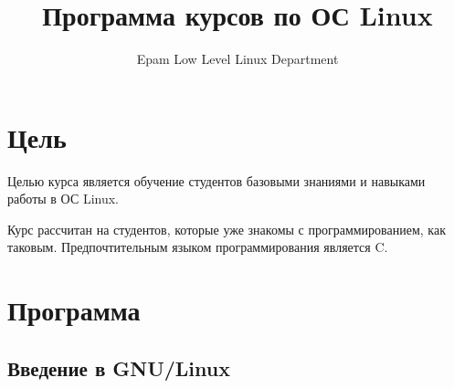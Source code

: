 \documentclass[12pt,a4paper,oneside]{article}
\begin{document}
\title{Программа курсов по ОС Linux}
\author{Epam Low Level Linux Department}
\maketitle

\renewcommand{\contentsname}{Оглавление}

\tableofcontents

\section{Цель}

Целью курса является обучение студентов базовыми знаниями и навыками работы в ОС Linux.

Курс рассчитан на студентов, которые уже знакомы с программированием, как таковым.
Предпочтительным языком программирования является C.

\newpage
\section{Программа}

\subsection{Введение в GNU/Linux}
\end{document}
